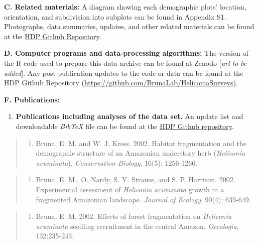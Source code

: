 \documentclass[
  12pt,
  man, donotrepeattitle,floatsintext]{apa6}
\providecommand{\tightlist}{%
  \setlength{\itemsep}{0pt}\setlength{\parskip}{0pt}}
\begin{document}
\noindent
\textbf{C. Related materials:} A diagram showing each demographic plots' location, orientation, and subdivision into subplots can be found in Appendix S1. Photographs, data summaries, updates, and other related materials can be found at the \href{https://github.com/BrunaLab/HeliconiaSurveys}{HDP Github Repository}.

\noindent
\textbf{D. Computer programs and data-processing algorithms:} The version of the R code used to prepare this data archive can be found at Zenodo {[}\emph{url to be added}{]}. Any post-publication updates to the code or data can be found at the HDP Github Repository (\url{https://github.com/BrunaLab/HeliconiaSurveys}).

\noindent
\textbf{F. Publications:}

\begin{enumerate}
\def\labelenumi{\arabic{enumi}.}
\tightlist
\item
  \textbf{Publications including analyses of the data set.} An update list and downloadable \emph{BibTeX} file can be found at the \href{https://github.com/BrunaLab/HeliconiaSurveys}{HDP Github repository}.
\end{enumerate}

\begin{quote}
\begin{enumerate}
\def\labelenumi{\arabic{enumi}.}
\tightlist
\item
  Bruna, E. M. and W. J. Kress. 2002. Habitat fragmentation and the demographic structure of an Amazonian understory herb (\emph{Heliconia acuminata}). \emph{Conservation Biology}, 16(5): 1256-1266.
\end{enumerate}
\end{quote}

\begin{quote}
\begin{enumerate}
\def\labelenumi{\arabic{enumi}.}
\setcounter{enumi}{1}
\tightlist
\item
  Bruna, E. M., O. Nardy, S. Y. Strauss, and S. P. Harrison. 2002. Experimental assessment of \emph{Heliconia acuminata} growth in a fragmented Amazonian landscape. \emph{Journal of Ecology}, 90(4): 639-649.
\end{enumerate}
\end{quote}

\begin{quote}
\begin{enumerate}
\def\labelenumi{\arabic{enumi}.}
\setcounter{enumi}{2}
\tightlist
\item
  Bruna, E. M. 2002. Effects of forest fragmentation on \emph{Heliconia acuminata} seedling recruitment in the central Amazon. \emph{Oecologia}, 132:235-243.
\end{enumerate}
\end{quote}
\end{document}
